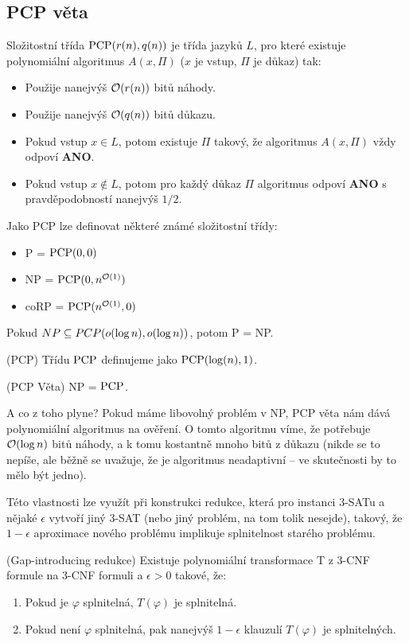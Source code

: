 \subsection{PCP věta}

\df Složitostní třída $\operatorname{PCP}(r(n), q(n))$ je třída jazyků $L$, pro které existuje
polynomiální algoritmus $A(x, \Pi)$ ($x$ je vstup, $\Pi$ je důkaz) tak:
\begin{itemize}
	\item Použije nanejvýš $\mathcal{O}(r(n))$ bitů náhody.
	\item Použije nanejvýš $\mathcal{O}(q(n))$ bitů důkazu.
	\item Pokud vstup $x \in L$, potom existuje $\Pi$ takový, že algoritmus
		$A(x, \Pi)$ vždy odpoví {\bf ANO}.
	\item Pokud vstup $x \notin L$, potom pro každý důkaz $\Pi$ algoritmus
		odpoví {\bf ANO} s pravděpodobností nanejvýš $1/2$.
\end{itemize}

\poz Jako PCP lze definovat některé známé složitostní třídy:
\begin{itemize}
	\item P = $\operatorname{PCP}(0,0)$
	\item NP = $\operatorname{PCP}(0, n^{\mathcal{O}(1)})$
	\item coRP = $\operatorname{PCP}(n^{\mathcal{O}(1)},0)$
\end{itemize}

\vt Pokud $NP \subseteq PCP(o(\log n), o(\log n))$, potom P = NP.

\df (PCP) Třídu $\operatorname{PCP}$ definujeme jako $\operatorname{PCP}(\log(n), 1)$.

\vt (PCP Věta) NP = $\operatorname{PCP}$.

A co z toho plyne? Pokud máme libovolný problém v NP, PCP věta nám dává
polynomiální algoritmus na ověření. O tomto algoritmu víme, že potřebuje
$\mathcal{O}(\log n)$ bitů náhody, a k tomu kostantně mnoho bitů z důkazu (nikde se to
nepíše, ale běžně se uvažuje, že je algoritmus neadaptivní -- ve skutečnosti by
to mělo být jedno).

Této vlastnosti lze využít při konstrukci redukce, která pro instanci $3$-SATu
a nějaké $\epsilon$ vytvoří jiný $3$-SAT (nebo jiný problém, na tom tolik
nesejde), takový, že $1-\epsilon$ aproximace nového problému implikuje
splnitelnost starého problému.

\vt (Gap-introducing redukce) Existuje polynomiální transformace T z $3$-CNF
formule na $3$-CNF formuli a $\epsilon > 0$ takové, že:
\begin{enumerate}
		\item Pokud je $\varphi$ splnitelná, $T(\varphi)$ je splnitelná.
		\item Pokud není $\varphi$ splnitelná, pak nanejvýš $1-\epsilon$
			klauzulí $T(\varphi)$ je splnitelných.
\end{enumerate}

